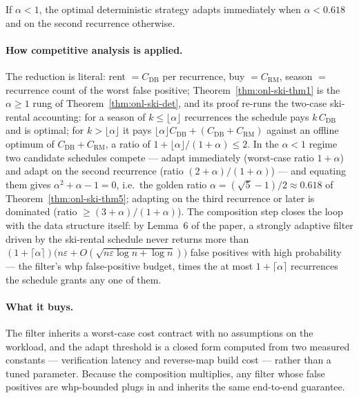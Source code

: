 \begin{theorem}\label{thm:onl-ski-thm5}
If $\alpha < 1$, the optimal deterministic strategy adapts immediately when
$\alpha < 0.618$ and on the second recurrence otherwise. \eop
\end{theorem}

\paragraph{How competitive analysis is applied.}
The reduction is literal: rent $= C_{\mathrm{DB}}$ per recurrence, buy $=
C_{\mathrm{RM}}$, season $=$ recurrence count of the worst false positive;
Theorem~\ref{thm:onl-ski-thm1} is the $\alpha \ge 1$ rung of
Theorem~\ref{thm:onl-ski-det}, and its proof re-runs the two-case ski-rental
accounting: for a season of $k \le \lfloor\alpha\rfloor$ recurrences the
schedule pays $k\,C_{\mathrm{DB}}$ and is optimal; for $k > \lfloor\alpha\rfloor$
it pays $\lfloor\alpha\rfloor C_{\mathrm{DB}} + (C_{\mathrm{DB}} +
C_{\mathrm{RM}})$ against an offline optimum of $C_{\mathrm{DB}} +
C_{\mathrm{RM}}$, a ratio of $1 + \lfloor\alpha\rfloor/(1+\alpha) \le 2$. In
the $\alpha < 1$ regime two candidate schedules compete --- adapt immediately
(worst-case ratio $1+\alpha$) and adapt on the second recurrence (ratio
$(2+\alpha)/(1+\alpha)$) --- and equating them gives $\alpha^2 + \alpha - 1 =
0$, i.e.\ the golden ratio $\alpha = (\sqrt{5}-1)/2 \approx 0.618$ of
Theorem~\ref{thm:onl-ski-thm5}; adapting on the third recurrence or later is
dominated (ratio $\ge (3+\alpha)/(1+\alpha)$). The composition step closes the
loop with the data structure itself: by Lemma~6 of the paper, a strongly
adaptive filter driven by the ski-rental schedule never returns more than
$(1+\lceil\alpha\rceil)\bigl(n\varepsilon +
O(\sqrt{n\varepsilon\log n + \log n})\bigr)$ false positives with high
probability --- the filter's whp false-positive budget, times the at most
$1+\lceil\alpha\rceil$ recurrences the schedule grants any one of them.

\paragraph{What it buys.}
The filter inherits a worst-case cost contract with no assumptions on the
workload, and the adapt threshold is a closed form computed from two measured
constants --- verification latency and reverse-map build cost --- rather than a
tuned parameter. Because the composition multiplies, any filter whose false
positives are whp-bounded plugs in and inherits the same end-to-end guarantee.

